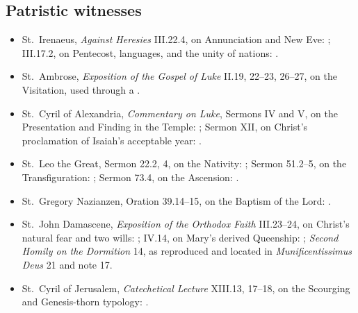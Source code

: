 \subsection{Patristic witnesses}

\begin{itemize}
  \item St.~Irenaeus, \emph{Against Heresies} III.22.4, on Annunciation and New Eve: ; III.17.2, on Pentecost, languages, and the unity of nations: .
  \item St.~Ambrose, \emph{Exposition of the Gospel of Luke} II.19, 22--23, 26--27, on the Visitation, used through a .
  \item St.~Cyril of Alexandria, \emph{Commentary on Luke}, Sermons IV and V, on the Presentation and Finding in the Temple: ; Sermon XII, on Christ's proclamation of Isaiah's acceptable year: .
  \item St.~Leo the Great, Sermon 22.2, 4, on the Nativity: ; Sermon 51.2--5, on the Transfiguration: ; Sermon 73.4, on the Ascension: .
  \item St.~Gregory Nazianzen, Oration 39.14--15, on the Baptism of the Lord: .
  \item St.~John Damascene, \emph{Exposition of the Orthodox Faith} III.23--24, on Christ's natural fear and two wills: ; IV.14, on Mary's derived Queenship: ; \emph{Second Homily on the Dormition} 14, as reproduced and located in \emph{Munificentissimus Deus} 21 and note 17.
  \item St.~Cyril of Jerusalem, \emph{Catechetical Lecture} XIII.13, 17--18, on the Scourging and Genesis-thorn typology: .

\end{itemize}
